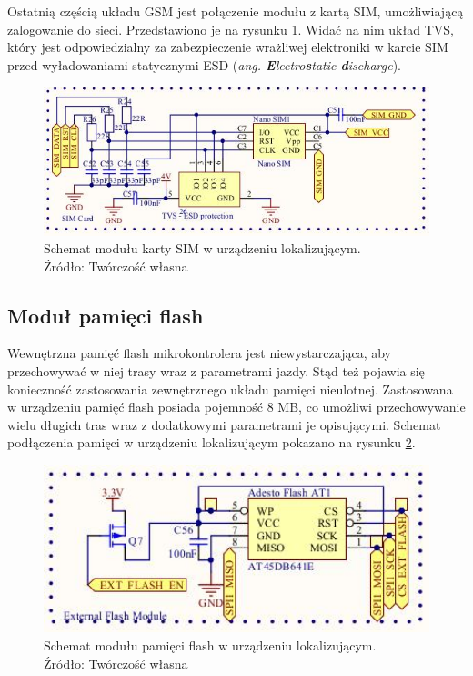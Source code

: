 Ostatnią częścią układu GSM jest połączenie modułu z kartą SIM, umożliwiającą zalogowanie do sieci. Przedstawiono je na rysunku \ref{fig:image_mainboard_functional_gsm_sim_card}. Widać na nim układ TVS, który jest odpowiedzialny za zabezpieczenie wrażliwej elektroniki w karcie SIM przed wyładowaniami statycznymi ESD (\textit{ang. \textbf{E}lectro\textbf{s}tatic \textbf{d}ischarge}).

\begin{figure}[H]
	\centering
	\includegraphics[width=15cm]{img/schematics/mainboard_gsm_sim_card.jpg}
	\caption{Schemat modułu karty SIM w urządzeniu lokalizującym. \\ Źródło: Twórczość własna}
	\label{fig:image_mainboard_functional_gsm_sim_card}
\end{figure}

\subsection{Moduł pamięci flash}

Wewnętrzna pamięć flash mikrokontrolera jest niewystarczająca, aby przechowywać w niej trasy wraz z parametrami jazdy. Stąd też pojawia się konieczność zastosowania zewnętrznego układu pamięci nieulotnej. Zastosowana w urządzeniu pamięć flash posiada pojemność 8 MB, co umożliwi przechowywanie wielu długich tras wraz z dodatkowymi parametrami je opisującymi. Schemat podłączenia pamięci w urządzeniu lokalizującym pokazano na rysunku \ref{fig:image_mainboard_functional_flash}.

\begin{figure}[H]
	\centering
	\includegraphics[width=15cm]{img/schematics/mainboard_functional_flash_memory.jpg}
	\caption{Schemat modułu pamięci flash w urządzeniu lokalizującym. \\ Źródło: Twórczość własna}
	\label{fig:image_mainboard_functional_flash}
\end{figure}


